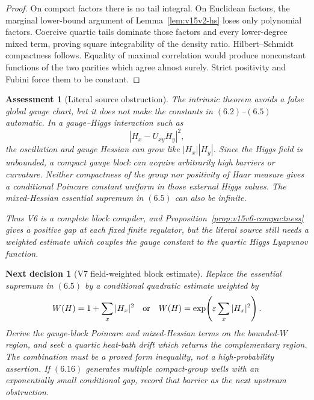 \documentclass[11pt]{article}
\newtheorem{decision}[theorem]{Next decision}
\newtheorem{assessment}[theorem]{Assessment}
\theoremstyle{remark}
\begin{document}
\begin{proof}
On compact factors there is no tail integral.  On Euclidean
factors, the marginal lower-bound argument of
Lemma~\ref{lem:v15v2-hs} loses only polynomial factors.
Coercive quartic tails dominate those factors and every
lower-degree mixed term, proving square integrability of the
density ratio.  Hilbert--Schmidt compactness follows.  Equality of
maximal correlation would produce nonconstant functions of the two
parities which agree almost surely.  Strict positivity and Fubini
force them to be constant.
\end{proof}

\begin{assessment}[Literal source obstruction]
\label{ass:v15v6-source}
The intrinsic theorem avoids a false global gauge chart, but it
does not make the constants in \((6.2)\)--\((6.5)\) automatic.
In a gauge--Higgs interaction such as
\[
 |H_x-U_{xy}H_y|^2,                                         \tag{6.16}
\]
the oscillation and gauge Hessian can grow like
\(|H_x||H_y|\).  Since the Higgs field is unbounded, a compact
gauge block can acquire arbitrarily high barriers or curvature.
Neither compactness of the group nor positivity of Haar measure
gives a conditional Poincare constant uniform in those external
Higgs values.  The mixed-Hessian essential supremum in \((6.5)\)
can also be infinite.

Thus V6 is a complete block compiler, and
Proposition~\ref{prop:v15v6-compactness} gives a positive gap at
each fixed finite regulator, but the literal source still needs a
weighted estimate which couples the gauge constant to the quartic
Higgs Lyapunov function.
\end{assessment}

\begin{decision}[V7 field-weighted block estimate]
\label{dec:v15v6-next}
Replace the essential supremum in \((6.5)\) by a conditional
quadratic estimate weighted by
\[
 W(H)=1+\sum_x|H_x|^2
 \quad\hbox{or}\quad
 W(H)=\exp\!\left(\varepsilon\sum_x|H_x|^2\right).
\]
Derive the gauge-block Poincare and mixed-Hessian terms on the
bounded-\(W\) region, and seek a quartic heat-bath drift which
returns the complementary region.  The combination must be a
proved form inequality, not a high-probability assertion.  If
\((6.16)\) generates multiple compact-group wells with an
exponentially small conditional gap, record that barrier as the
next upstream obstruction.
\end{decision}
\end{document}
